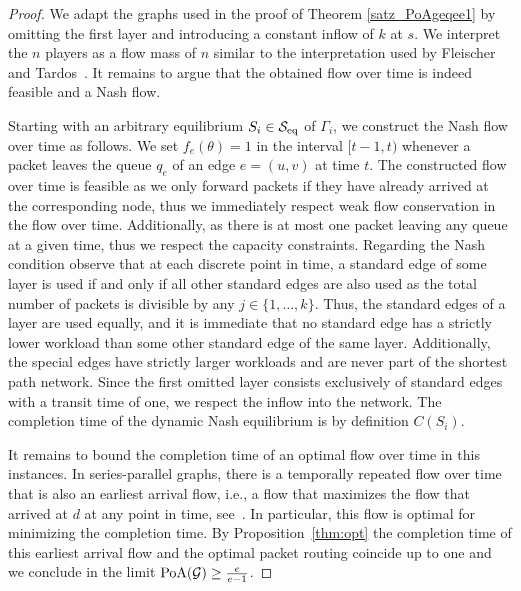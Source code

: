 \propositionFlowOverTimeLowerBound*
\begin{proof}
We adapt the graphs used in the proof of Theorem \ref{satz_PoAgeqee1} by omitting the first layer and introducing a constant inflow of $k$ at $s$. We interpret the $n$ players as a flow mass of $n$ similar to the interpretation used by Fleischer and Tardos~\cite{DBLP:journals/orl/FleischerT98}. It remains to argue that the obtained flow over time is indeed feasible and a Nash flow.

Starting with an arbitrary equilibrium $S_i\in \mathcal{S}_{\operatorname{eq}}$ of $\Gamma_i$, we construct the Nash flow over time as follows. We set $f_e(\theta)=1$ in the interval \mbox{$[t-1,t)$} whenever a packet leaves the queue $q_e$ of an edge $e=(u,v)$ at time $t$. The constructed flow over time is feasible as we only forward packets if they have already arrived at the corresponding node, thus we immediately respect weak flow conservation in the flow over time. Additionally, as there is at most one packet leaving any queue at a given time, thus we respect the capacity constraints. Regarding the Nash condition observe that at each discrete point in time, a standard edge of some layer is used if and only if all other standard edges are also used as the total number of packets is divisible by any \mbox{$j\in \{1,\ldots, k\}$}. Thus, the standard edges of a layer are used equally, and it is immediate that no standard edge has a strictly lower workload than some other standard edge of the same layer. Additionally, the special edges have strictly larger workloads and are never part of the shortest path network. Since the first omitted layer consists exclusively of standard edges with a transit time of one, we respect the inflow into the network. The completion time of the dynamic Nash equilibrium is by definition $C(S_i)$.

It remains to bound the completion time of an optimal flow over time in this instances. In series-parallel graphs, there is a temporally repeated flow over time that is also an earliest arrival flow, i.e., a flow that maximizes the flow that arrived at $d$ at any point in time, see~\cite{Skutella2009survey}. In particular, this flow is optimal for minimizing the completion time. By Proposition~\ref{thm:opt} the completion time of this earliest arrival flow and the optimal packet routing coincide up to one and we conclude in the limit $\operatorname*{PoA}(\mathcal{G})\geq \frac{e}{e-1}$.
\end{proof}
